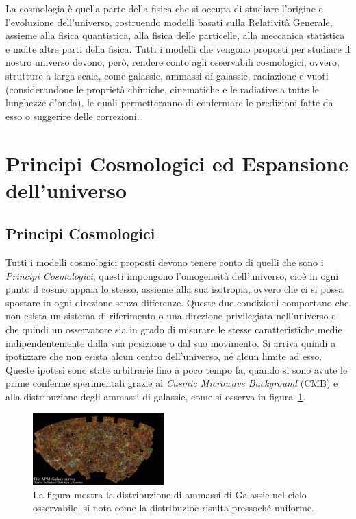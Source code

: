 La cosmologia è quella parte della fisica che si occupa di studiare l'origine e l'evoluzione dell'universo, costruendo modelli basati sulla Relatività Generale, assieme alla fisica quantistica, alla fisica delle particelle, alla meccanica statistica e molte altre parti della fisica. Tutti i modelli che vengono proposti per studiare il nostro universo devono, però, rendere conto agli osservabili cosmologici, ovvero, strutture a larga scala, come galassie, ammassi di galassie, radiazione e vuoti (considerandone le proprietà chimiche, cinematiche e le radiative a tutte le lunghezze d'onda), le quali permetteranno di confermare le predizioni fatte da esso o suggerire delle correzioni.
\section{Principi Cosmologici ed Espansione dell'universo}\label{sec:principi-espansione}
\subsection{Principi Cosmologici}\label{sec:principi-cosmologici}

Tutti i modelli cosmologici proposti devono tenere conto di quelli che sono i \textit{Principi Cosmologici}, questi impongono l'omogeneità dell'universo, cioè in ogni punto il cosmo appaia lo stesso, assieme alla sua isotropia, ovvero che ci si possa spostare in ogni direzione senza differenze. Queste due condizioni comportano che non esista un sistema di riferimento o una direzione privilegiata nell'universo e che quindi un osservatore sia in grado di misurare le stesse caratteristiche medie indipendentemente dalla sua posizione o dal suo movimento. Si arriva quindi a ipotizzare che non esista alcun centro dell'universo, né alcun limite ad esso. Queste ipotesi sono state arbitrarie fino a poco tempo fa, quando si sono avute le prime conferme sperimentali grazie al \textit{Casmic Microwave Background} (CMB) e alla distribuzione degli ammassi di galassie, come si osserva in figura~\ref{fig:APM}.
\begin{figure}
    \centering
    \includegraphics[width=0.45\textwidth]{immagini/APM.png}
    \caption{La figura mostra la distribuzione di ammassi di Galassie nel cielo osservabile, si nota come la distribuzioe risulta pressoché uniforme.}\label{fig:APM}
\end{figure}
